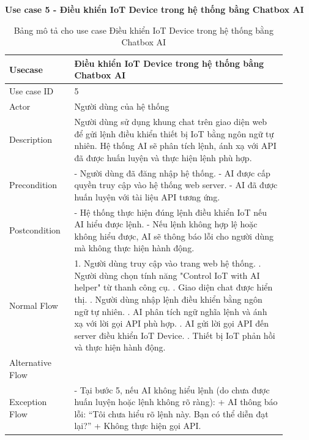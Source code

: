 \textbf{Use case 5 - Điều khiển IoT Device trong hệ thống bằng Chatbox AI}

\renewcommand{\arraystretch}{1.6}
\begin{table}[H]
\centering
\begin{tabular}{|p{0.2\linewidth}|p{0.7\linewidth}|}
\hline
\rowcolor[HTML]{EFEFEF} 
\textbf{Usecase}        & \textbf{Điều khiển IoT Device trong hệ thống bằng Chatbox AI} \\ \hline
Use case ID             & 5 \\ \hline
Actor                   & Người dùng của hệ thống \\ \hline
Description             & Người dùng sử dụng khung chat trên giao diện web để gửi lệnh điều khiển thiết bị IoT bằng ngôn ngữ tự nhiên. Hệ thống AI sẽ phân tích lệnh, ánh xạ với API đã được huấn luyện và thực hiện lệnh phù hợp. \\ \hline
Precondition            & 
    - Người dùng đã đăng nhập hệ thống. \newline
    - AI được cấp quyền truy cập vào hệ thống web server. \newline
    - AI đã được huấn luyện với tài liệu API tương ứng.
\\ \hline
Postcondition           &  
    - Hệ thống thực hiện đúng lệnh điều khiển IoT nếu AI hiểu được lệnh. \newline
    - Nếu lệnh không hợp lệ hoặc không hiểu được, AI sẽ thông báo lỗi cho người dùng mà không thực hiện hành động.
\\ \hline
Normal Flow             & 
    1. Người dùng truy cập vào trang web hệ thống. \newline
    2. Người dùng chọn tính năng "Control IoT with AI helper" từ thanh công cụ. \newline
    3. Giao diện chat được hiển thị. \newline
    4. Người dùng nhập lệnh điều khiển bằng ngôn ngữ tự nhiên. \newline
    5. AI phân tích ngữ nghĩa lệnh và ánh xạ với lời gọi API phù hợp. \newline
    6. AI gửi lời gọi API đến server điều khiển IoT Device. \newline
    7. Thiết bị IoT phản hồi và thực hiện hành động.
\\ \hline
Alternative Flow          & 
\\ \hline
Exception Flow          &  
- Tại bước 5, nếu AI không hiểu lệnh (do chưa được huấn luyện hoặc lệnh không rõ ràng): \newline
+ AI thông báo lỗi: “Tôi chưa hiểu rõ lệnh này. Bạn có thể diễn đạt lại?” \newline
+ Không thực hiện gọi API.
\\ \hline
\end{tabular}
\caption{Bảng mô tả cho use case Điều khiển IoT Device trong hệ thống bằng Chatbox AI}
\end{table}

